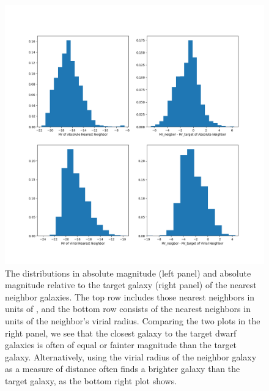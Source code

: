 \begin{figure}
    \includegraphics[width=\textwidth]{Images/smallScaleEnvironment/Mr_distribution}
    \caption[Distribution of absolute magnitudes of nearest neighbors]{The 
    distributions in absolute magnitude (left panel) and absolute magnitude 
    relative to the target galaxy (right panel) of the nearest neighbor 
    galaxies.  The top row includes those nearest neighbors in units of \hMpc, 
    and the bottom row consists of the nearest neighbors in units of the 
    neighbor's virial radius.  Comparing the two plots in the right panel, we 
    see that the closest galaxy to the target dwarf galaxies is often of equal 
    or fainter magnitude than the target galaxy.  Alternatively, using the 
    virial radius of the neighbor galaxy as a measure of distance often finds a 
    brighter galaxy than the target galaxy, as the bottom right plot shows.}
    \label{fig:Mr_dist}
\end{figure}

